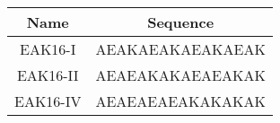 \documentclass[preprint,preprintnumbers,amsmath,amssymb,showpacs,pre]{revtex4-1}
\begin{document}
\newpage

\begin{table}
  \centering
  \caption{}
  \begin{tabular}[t]{c|c}
    \hline
     Name & Sequence \\
    \hline
     EAK16-I  & AEAKAEAKAEAKAEAK \\
     EAK16-II & AEAEAKAKAEAEAKAK \\
     EAK16-IV & AEAEAEAEAKAKAKAK \\
    \hline
  \end{tabular}
\end{table}

\end{document}
